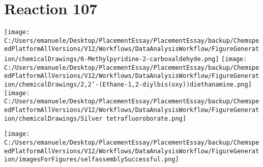 \documentclass{article}%
\begin{document}
\section*{Reaction 107}%
%
\begin{scheme}[H]%
\begin{minipage}{0.5\textwidth}%
\texttt{[image: C:/Users/emanuele/Desktop/PlacementEssay/PlacementEssay/backup/ChemspeedPlatformAllVersions/V12/Workflows/DataAnalysisWorkflow/FigureGeneration/chemicalDrawings/6-Methylpyridine-2-carboxaldehyde.png]}%
\texttt{[image: C:/Users/emanuele/Desktop/PlacementEssay/PlacementEssay/backup/ChemspeedPlatformAllVersions/V12/Workflows/DataAnalysisWorkflow/FigureGeneration/chemicalDrawings/2,2'-(Ethane-1,2-diylbis(oxy))diethanamine.png]}%
\texttt{[image: C:/Users/emanuele/Desktop/PlacementEssay/PlacementEssay/backup/ChemspeedPlatformAllVersions/V12/Workflows/DataAnalysisWorkflow/FigureGeneration/chemicalDrawings/Silver tetrafluoroborate.png]}%
\end{minipage}%
\begin{minipage}{0.5\textwidth}%
\begin{center}%
\texttt{[image: C:/Users/emanuele/Desktop/PlacementEssay/PlacementEssay/backup/ChemspeedPlatformAllVersions/V12/Workflows/DataAnalysisWorkflow/FigureGeneration/imagesForFigures/selfassemblySuccessful.png]}%
\end{center}%
\end{minipage}%
\caption{Self-assembly of components 8, 19, with Silver(I) in a 3.0:1.5:1.0 molar ratio in CH$_3$CN at 60\textdegree C for 40h. These are the reagents (starting materials) for reaction 107.}%
\end{scheme}%
\end{document}
